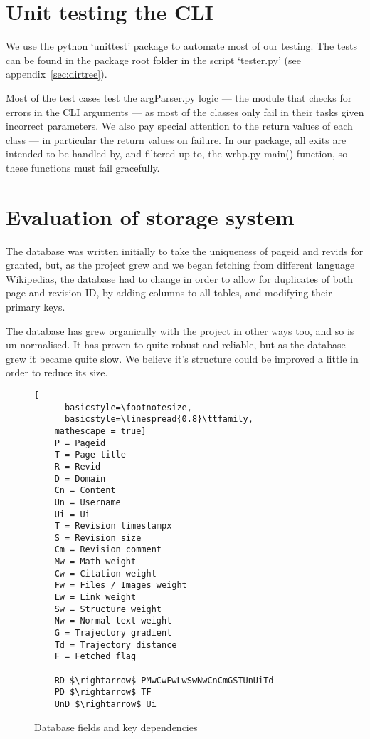 \section{Unit testing the CLI}
We use the python `unittest' package to automate most of our
testing. The tests can be found in the package root folder in the
script `tester.py' (see appendix~\ref{sec:dirtree}).

Most of the test cases test the argParser.py logic --- the module that
checks for errors in the CLI arguments --- as most of the classes only
fail in their tasks given incorrect parameters. We also pay special
attention to the return values of each class --- in particular the
return values on failure. In our package, all exits are intended to be
handled by, and filtered up to, the wrhp.py main() function, so these
functions must fail gracefully.

\section{Evaluation of storage system}
The database was written initially to take the uniqueness of pageid
and revids for granted, but, as the project grew and we began fetching
from different language Wikipedias, the database had to change in
order to allow for duplicates of both page and revision ID, by adding
columns to all tables, and modifying their primary keys.

The database has grew organically with the project in other ways too,
and so is un-normalised. It has proven to quite robust and reliable,
but as the database grew it became quite slow. We believe it's
structure could be improved a little in order to reduce its size.

\begin{wrapfigure}{R}{0.45\linewidth}
  \begin{lstlisting}[
      basicstyle=\footnotesize,
      basicstyle=\linespread{0.8}\ttfamily,
    mathescape = true]
    P = Pageid
    T = Page title
    R = Revid
    D = Domain
    Cn = Content
    Un = Username
    Ui = Ui
    T = Revision timestampx
    S = Revision size
    Cm = Revision comment
    Mw = Math weight
    Cw = Citation weight
    Fw = Files / Images weight
    Lw = Link weight
    Sw = Structure weight
    Nw = Normal text weight
    G = Trajectory gradient
    Td = Trajectory distance
    F = Fetched flag

    RD $\rightarrow$ PMwCwFwLwSwNwCnCmGSTUnUiTd
    PD $\rightarrow$ TF
    UnD $\rightarrow$ Ui
  \end{lstlisting}
  \caption{Database fields and key dependencies}
  \label{fig:dat-key}
\end{wrapfigure}

